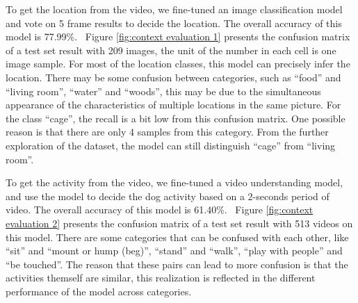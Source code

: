 \documentclass[letterpaper]{article}
\newcommand{\figref}[1]{Figure \ref{#1}}
\begin{document}
To get the location from the video, we fine-tuned an image classification model and vote on 5 frame results to decide the location. 
The overall accuracy of this model is 77.99\%. ~\figref{fig:context evaluation 1} presents the confusion matrix of a test set result with 209 images, the unit of the number in each cell is one image sample. For most of the location classes, this model can precisely infer the location. There may be some confusion between categories, such as ``food'' and ``living room'', ``water'' and ``woods'', this may be due to the simultaneous appearance of the characteristics of multiple locations in the same picture. For the class ``cage'', the recall is a bit low from this confusion matrix. One possible reason is that there are only 4 samples from this category. From the further exploration of the dataset, the model can still distinguish ``cage'' from ``living room''. 

To get the activity from the video, we fine-tuned a video understanding model, and use the model to decide the dog activity based on a 2-seconds period of video. The overall accuracy of this model is 61.40\%. ~\figref{fig:context evaluation 2} presents the confusion matrix of a test set result with 513 videos on this model. There are some categories that can be confused with each other, like ``sit'' and ``mount or hump (beg)'', ``stand'' and ``walk'', ``play with people'' and ``be touched''. The reason that these pairs can lead to more confusion is that the activities themself are similar, this realization is reflected in the different performance of the model across categories. 
\end{document}
